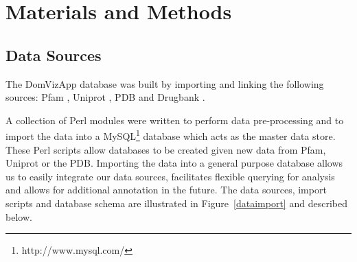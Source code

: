 \section{Materials and Methods}
% 


\subsection{Data Sources}

The DomVizApp database was built by importing and linking the following sources: Pfam \cite{pfamdb}, Uniprot \cite{uniprot}, PDB \cite{pdb} and Drugbank \cite{drugbank}.

A collection of Perl modules were written to perform data pre-processing and to import the data into a MySQL\footnote{http://www.mysql.com/} database which acts as the master data store. These Perl scripts allow databases to be created given new data from Pfam, Uniprot or the PDB. Importing the data into a general purpose database allows us to easily integrate our data sources, facilitates flexible querying for analysis and allows for additional annotation in the future. The data sources, import scripts and database schema are illustrated in Figure~\ref{dataimport} and described below.  

